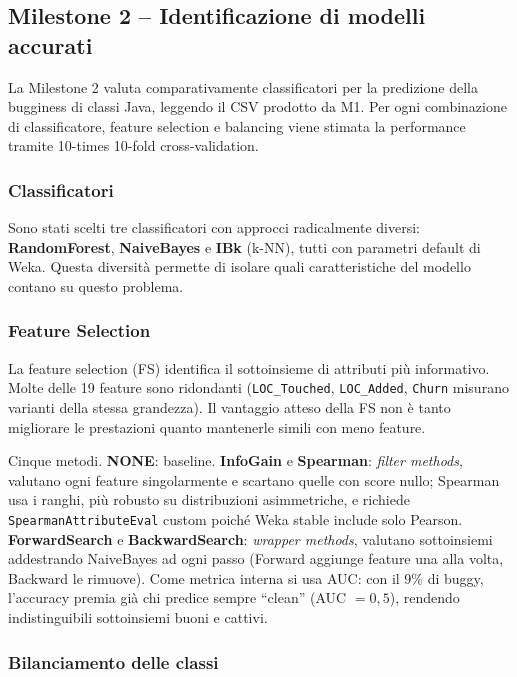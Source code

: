 \subsection{Milestone 2 -- Identificazione di modelli accurati}

La Milestone 2 valuta comparativamente classificatori per la predizione della bugginess
di classi Java, leggendo il CSV prodotto da M1. Per ogni
combinazione di classificatore, feature selection e balancing viene stimata la performance
tramite 10-times 10-fold cross-validation.

\subsubsection{Classificatori}

Sono stati scelti tre classificatori con approcci radicalmente diversi:
\textbf{RandomForest}, \textbf{NaiveBayes} e \textbf{IBk} (k-NN), tutti con parametri
default di Weka. Questa diversità permette di isolare quali caratteristiche del
modello contano su questo problema.

\subsubsection{Feature Selection}

La feature selection (FS) identifica il sottoinsieme di attributi più informativo.
Molte delle 19 feature sono ridondanti (\texttt{LOC\_Touched}, \texttt{LOC\_Added},
\texttt{Churn} misurano varianti della stessa grandezza). Il vantaggio atteso della FS
non è tanto migliorare le prestazioni quanto mantenerle simili con meno feature.

Cinque metodi. \textbf{NONE}: baseline. \textbf{InfoGain} e \textbf{Spearman}:
\emph{filter methods}, valutano ogni feature singolarmente e scartano quelle con score
nullo; Spearman usa i ranghi, più robusto su distribuzioni asimmetriche, e richiede
\texttt{SpearmanAttributeEval} custom poiché Weka stable include solo Pearson.
\textbf{ForwardSearch} e \textbf{BackwardSearch}: \emph{wrapper methods}, valutano
sottoinsiemi addestrando NaiveBayes ad ogni passo (Forward aggiunge feature una alla
volta, Backward le rimuove). Come metrica interna si usa AUC: con il 9\% di buggy,
l'accuracy premia già chi predice sempre ``clean'' (AUC $= 0{,}5$), rendendo
indistinguibili sottoinsiemi buoni e cattivi.

\subsubsection{Bilanciamento delle classi}

